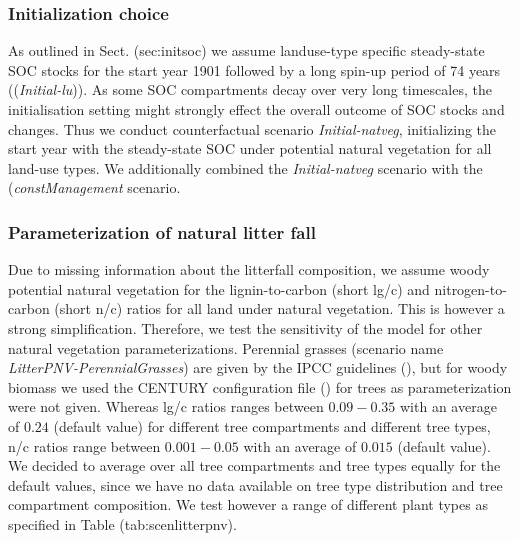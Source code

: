 \documentclass[gc, manuscript]{copernicus}
\begin{document}
\hypertarget{sec:scen_initial}{%
\subsubsection{Initialization choice}\label{sec:scen_initial}}

As outlined in Sect. \citet{ref}(sec:initsoc) we assume landuse-type specific steady-state SOC stocks for the start year 1901 followed by a long spin-up period of 74 years ((\textit{Initial-lu})). As some SOC compartments decay over very long timescales, the initialisation setting might strongly effect the overall outcome of SOC stocks and changes. Thus we conduct counterfactual scenario \textit{Initial-natveg}, initializing the start year with the steady-state SOC under potential natural vegetation for all land-use types. We additionally combined the \textit{Initial-natveg} scenario with the (\textit{constManagement} scenario.

\hypertarget{sec:scenlitterpnv}{%
\subsubsection{Parameterization of natural litter fall}\label{sec:scenlitterpnv}}

Due to missing information about the litterfall composition, we assume woody potential natural vegetation for the lignin-to-carbon (short lg/c) and nitrogen-to-carbon (short n/c) ratios for all land under natural vegetation. This is however a strong simplification. Therefore, we test the sensitivity of the model for other natural vegetation parameterizations. Perennial grasses (scenario name \textit{LitterPNV-PerennialGrasses}) are given by the IPCC guidelines (\citep{calvo_buendia_ipcc_2019}), but for woody biomass we used the CENTURY configuration file (\citep{century_model_2000}) for trees as parameterization were not given. Whereas lg/c ratios ranges between \(0.09-0.35\) with an average of \(0.24\) (default value) for different tree compartments and different tree types, n/c ratios range between \(0.001-0.05\) with an average of \(0.015\) (default value). We decided to average over all tree compartments and tree types equally for the default values, since we have no data available on tree type distribution and tree compartment composition. We test however a range of different plant types as specified in Table \citet{ref}(tab:scenlitterpnv).
\end{document}
